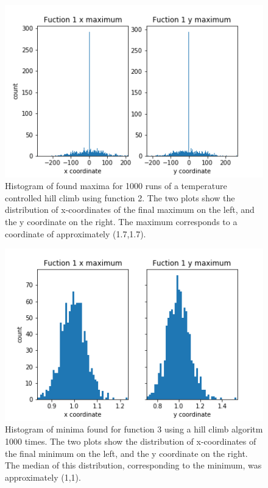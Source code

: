 \documentclass[twocolumn]{article}
\begin{document}
\begin{figure}[p]
	\centering
	\includegraphics[width=\linewidth]{"function 2 maximum"}
	\caption{Histogram of found maxima for 1000 runs of a temperature controlled hill climb using function 2. The two plots show the distribution of x-coordinates of the final maximum on the left, and the y coordinate on the right. The maximum corresponds to a coordinate of approximately (1.7,1.7).}
	\label{fig:figure2maximum}
\end{figure}

\begin{figure}[h]
	\centering
	\includegraphics[width=\linewidth]{"function 3 maximum"}
	\caption{Histogram of minima found for function 3 using a hill climb algoritm 1000 times. The two plots show the distribution of x-coordinates of the final minimum on the left, and the y coordinate on the right. The median of this distribution, corresponding to the minimum, was approximately (1,1).}
	\label{fig:figure3maximum}
\end{figure}
\end{document}
